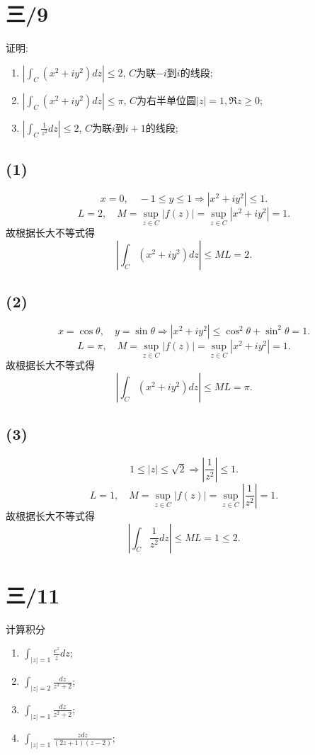\documentclass[11pt,a4paper]{article}
\begin{document}
\section{三/9}
\begin{problem}
证明:
\begin{enumerate}
  \item $\displaystyle\left|\int_C(x^2+iy^2)dz\right|\leqslant2$, $C$为联$-i$到$i$的线段;
  \item $\displaystyle\left|\int_C(x^2+iy^2)dz\right|\leqslant\pi$, $C$为右半单位圆$|z|=1,\Re z\geqslant 0$;
  \item $\displaystyle\left|\int_C\frac{1}{z^2}dz\right|\leqslant2$, $C$为联$i$到$i+1$的线段;
\end{enumerate}
\end{problem}

\subsection*{(1)}
$$x=0,\quad-1\leqslant y\leqslant 1\Longrightarrow|x^2+iy^2|\leqslant 1.$$
$$L=2,\quad M=\sup_{z\in C}|f(z)|=\sup_{z\in C}|x^2+iy^2|=1.$$
故根据长大不等式得
$$\left|\int_C(x^2+iy^2)dz\right|\leqslant ML=2.$$

\subsection*{(2)}
$$x=\cos\theta,\quad y=\sin\theta \Longrightarrow|x^2+iy^2|\leqslant \cos^2\theta+\sin^2\theta=1.$$
$$L=\pi,\quad M=\sup_{z\in C}|f(z)|=\sup_{z\in C}|x^2+iy^2|=1.$$
故根据长大不等式得
$$\left|\int_C(x^2+iy^2)dz\right|\leqslant ML=\pi.$$

\subsection*{(3)}
$$1\leqslant|z|\leqslant\sqrt{2}\Longrightarrow\left|\frac{1}{z^2}\right|\leqslant 1.$$
$$L=1,\quad M=\sup_{z\in C}|f(z)|=\sup_{z\in C}\left|\frac{1}{z^2}\right|=1.$$
故根据长大不等式得
$$\left|\int_C\frac{1}{z^2}dz\right|\leqslant ML=1\leqslant 2.$$

\section{三/11}
\begin{problem}
计算积分
\begin{enumerate}
  \item $\displaystyle\int_{|z|=1}\frac{e^z}{z}dz$;
  \item $\displaystyle\int_{|z|=2}\frac{dz}{z^2+2}$;
  \item $\displaystyle\int_{|z|=1}\frac{dz}{z^2+2}$;
  \item $\displaystyle\int_{|z|=1}\frac{zdz}{(2z+1)(z-2)}$;
\end{enumerate}
\end{problem}
\end{document}
